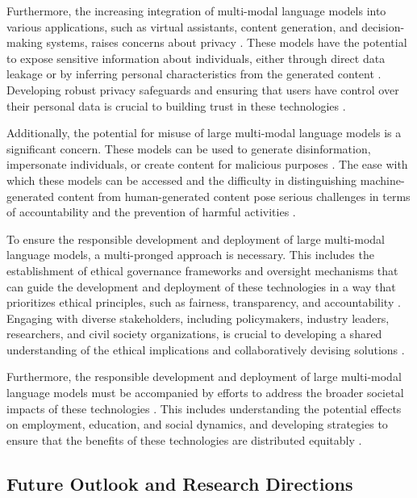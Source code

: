 \documentclass[11pt]{article}
\begin{document}
Furthermore, the increasing integration of multi-modal language models into various applications, such as virtual assistants, content generation, and decision-making systems, raises concerns about privacy \cite{ref232,ref366}. These models have the potential to expose sensitive information about individuals, either through direct data leakage or by inferring personal characteristics from the generated content \cite{ref86,ref79}. Developing robust privacy safeguards and ensuring that users have control over their personal data is crucial to building trust in these technologies \cite{ref81}.

Additionally, the potential for misuse of large multi-modal language models is a significant concern. These models can be used to generate disinformation, impersonate individuals, or create content for malicious purposes \cite{ref103,ref367}. The ease with which these models can be accessed and the difficulty in distinguishing machine-generated content from human-generated content pose serious challenges in terms of accountability and the prevention of harmful activities \cite{ref89,ref91}.

To ensure the responsible development and deployment of large multi-modal language models, a multi-pronged approach is necessary. This includes the establishment of ethical governance frameworks and oversight mechanisms \cite{ref368} that can guide the development and deployment of these technologies in a way that prioritizes ethical principles, such as fairness, transparency, and accountability \cite{ref235,ref369}. Engaging with diverse stakeholders, including policymakers, industry leaders, researchers, and civil society organizations, is crucial to developing a shared understanding of the ethical implications and collaboratively devising solutions \cite{ref370,ref371}.

Furthermore, the responsible development and deployment of large multi-modal language models must be accompanied by efforts to address the broader societal impacts of these technologies \cite{ref372,ref373}. This includes understanding the potential effects on employment, education, and social dynamics, and developing strategies to ensure that the benefits of these technologies are distributed equitably \cite{ref288,ref283}.

\subsection{Future Outlook and Research Directions}
\end{document}
